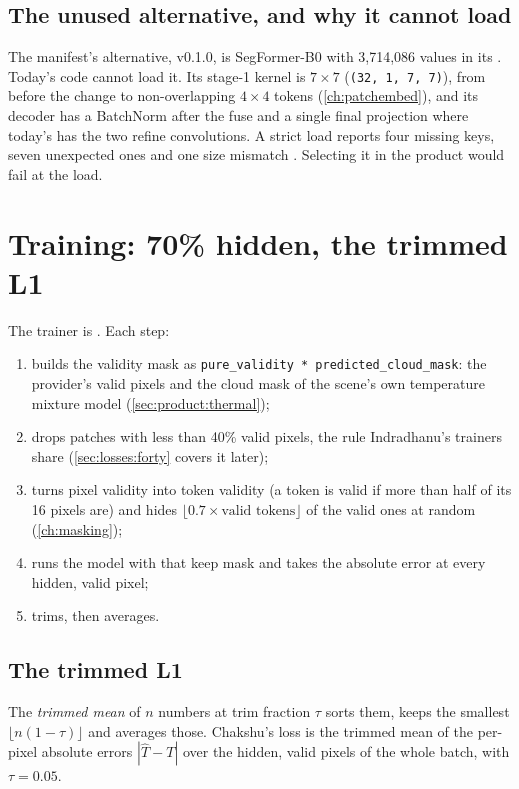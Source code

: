 \subsection{The unused alternative, and why it cannot load}

The manifest's alternative, v0.1.0, is SegFormer-B0 with 3,714,086 values in its . Today's code
cannot load it. Its stage-1 kernel is $7\times7$ (\lstinline!(32, 1, 7, 7)!), from before the change to non-overlapping
$4\times4$ tokens (\cref{ch:patchembed}), and its decoder has a BatchNorm after the fuse and a single final
projection where today's has the two refine convolutions. A strict load reports four missing keys, seven unexpected
ones and one size mismatch \tagC. Selecting it in the product would fail at the load.

\section{Training: 70\% hidden, the trimmed L1}\label{sec:chakshu:train}

The trainer is . Each step:
\begin{enumerate}
\item builds the validity mask as \lstinline!pure_validity * predicted_cloud_mask!: the provider's valid pixels and the
  cloud mask of the scene's own temperature mixture model (\cref{sec:product:thermal});
\item drops patches with less than 40\% valid pixels, the rule Indradhanu's trainers share (\cref{sec:losses:forty}
  covers it later);
\item turns pixel validity into token validity (a token is valid if more than half of its 16 pixels are) and hides
  $\lfloor0.7\times\text{valid tokens}\rfloor$ of the valid ones at random (\cref{ch:masking});
\item runs the model with that keep mask and takes the absolute error at every hidden, valid pixel;
\item trims, then averages.
\end{enumerate}

\subsection{The trimmed L1}

\begin{definition}
The \emph{trimmed mean} of $n$ numbers at trim fraction $\tau$ sorts them, keeps the smallest
$\lfloor n(1-\tau)\rfloor$ and averages those. Chakshu's loss is the trimmed mean of the per-pixel absolute errors
$|\hat T-T|$ over the hidden, valid pixels of the whole batch, with $\tau=0.05$.
\end{definition}

